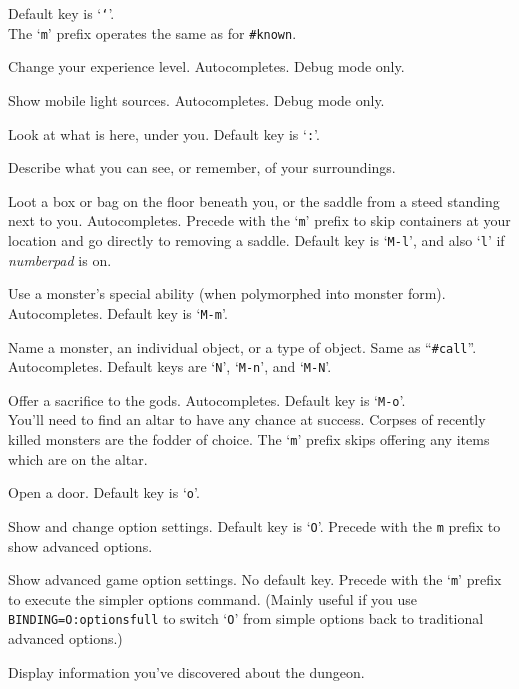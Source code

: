 \documentclass[titlepage]{article}
\begin{document}
\begin{description}[font=\mdseries\ttfamily]
Default key is `\texttt{`}'.
\\
The `\texttt{m}' prefix operates the same as for \texttt{\#known}.
\item[\#levelchange]
Change your experience level.
Autocompletes.
Debug mode only.
\item[\#lightsources]
Show mobile light sources.
Autocompletes.
Debug mode only.
\item[\#look]
Look at what is here, under you. Default key is `\texttt{:}'.
\item[\#lookaround]
Describe what you can see, or remember, of your surroundings.
\item[\#loot]
Loot a box or bag on the floor beneath you, or the saddle
from a steed standing next to you. Autocompletes.
Precede with the `\texttt{m}' prefix to skip containers at your location
and go directly to removing a saddle.
Default key is `\texttt{M-l}',
and also `\texttt{l}' if \textit{number\textunderscore pad} is on.
\item[\#monster]
Use a monster's special ability (when polymorphed into monster form).
Autocompletes. Default key is `\texttt{M-m}'.
\item[\#name]
Name a monster, an individual object, or a type of object.
Same as ``\texttt{\#call}''.
Autocompletes.
Default keys are `\texttt{N}', `\texttt{M-n}', and `\texttt{M-N}'.
\item[\#offer]
Offer a sacrifice to the gods. Autocompletes. Default key is `\texttt{M-o}'.\\
You'll need to find an altar to have any chance at success.
Corpses of recently killed monsters are the fodder of choice.
The `\texttt{m}' prefix skips offering any items which are on the altar.\\
\item[\#open]
Open a door. Default key is `\texttt{o}'.
\item[\#options]
Show and change option settings. Default key is `\texttt{O}'.
Precede with the \texttt{m} prefix to show advanced options.
\item[\#optionsfull]
Show advanced game option settings.
No default key.
Precede with the `\texttt{m}' prefix to execute the simpler options command.
(Mainly useful if you use \texttt{BINDING=O:optionsfull} to switch
`\texttt{O}' from simple options back to traditional advanced options.)
\item[\#overview]
Display information you've discovered about the dungeon.

\end{description}
\end{document}
